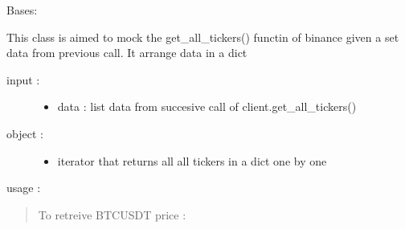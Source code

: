 \documentclass[letterpaper,10pt,english]{sphinxmanual}
\begin{document}

\begin{fulllineitems}
\label{\detokenize{my_tools.cryptools:my_tools.cryptools.mock.tickers_mock}}
\sphinxAtStartPar
Bases: 

\sphinxAtStartPar
This class is aimed to mock the get\_all\_tickers() functin of binance
given a set data from previous call. It arrange data in a dict
\begin{description}
\item[{input :}] \leavevmode\begin{itemize}
\item {} 
\sphinxAtStartPar
data : list data from succesive call of client.get\_all\_tickers()

\end{itemize}

\item[{object :}] \leavevmode\begin{itemize}
\item {} 
\sphinxAtStartPar
iterator that returns all all tickers in a dict one by one

\end{itemize}

\end{description}

\sphinxAtStartPar
usage :
\begin{quote}

\sphinxAtStartPar
To retreive BTCUSDT price :

\begin{sphinxVerbatim}[commandchars=\\\{\}]
   
    \PYG{p}{[}\PYG{p}{]}
\end{sphinxVerbatim}
\end{quote}

\end{fulllineitems}
\end{document}
